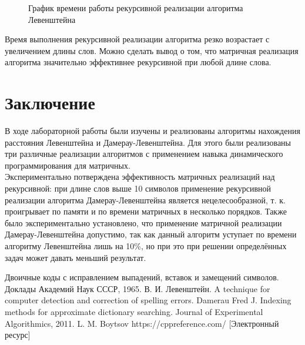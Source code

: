 \documentclass[12pt, a4paper]{report}
\begin{document}
	\begin{figure}[ht!]
		\caption{График времени работы рекурсивной реализации алгоритма Левенштейна}
	\end{figure}

	
 	Время выполнения рекурсивной реализации алгоритма резко возрастает с увеличением длины слов. Можно сделать вывод о том, что матричная реализация алгоритма значительно эффективнее рекурсивной при любой длине слова.

	\chapter*{Заключение}
	В ходе лабораторной работы были изучены и реализованы алгоритмы нахождения расстояния Левенштейна и Дамерау-Левенштейна. Для этого были реализованы три различные реализации алгоритмов с применением навыка динамического программирования для матричных.\\
	Экспериментально потверждена эффективность матричных реализаций над рекурсивной: при длине слов выше 10 символов применение рекурсивной реализации алгоритма Дамерау-Левенштейна является нецелесообразной, т. к. проигрывает по памяти и по времени матричных в несколько порядков. Также было экспериментально установлено, что применение матричной реализации Дамерау-Левенштейна допустимо, так как данный алгоритм уступает по времени алгоритму Левенштейна лишь на 10\%, но при это при решении определённых задач может давать меньший результат.
	\newpage
	
	\begin{thebibliography}{}
	 Двоичные коды с исправлением выпадений, вставок и замещений символов. Доклады Академий Наук СССР, 1965. В. И. Левенштейн.
	 A technique for computer detection and correction of spelling errors. Damerau Fred J.
	 Indexing methods for approximate dictionary searching. Journal of Experimental Algorithmics, 2011. L. M. Boytsov
	 https://cppreference.com/ [Электронный ресурс]
	\end{thebibliography}
\end{document}
